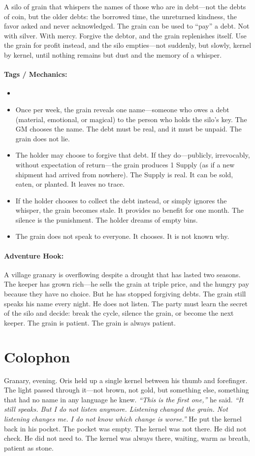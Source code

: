 A silo of grain that whispers the names of those who are in debt—not the debts of coin, but the older debts: the borrowed time, the unreturned kindness, the favor asked and never acknowledged. The grain can be used to ``pay''{} a debt. Not with silver. With mercy. Forgive the debtor, and the grain replenishes itself. Use the grain for profit instead, and the silo empties—not suddenly, but slowly, kernel by kernel, until nothing remains but dust and the memory of a whisper.

\paragraph{Tags / Mechanics:}
\begin{itemize}
\item [HEAL] [TRUTH] [SILENCE]
\item Once per week, the grain reveals one name—someone who owes a debt (material, emotional, or magical) to the person who holds the silo's key. The GM chooses the name. The debt must be real, and it must be unpaid. The grain does not lie.
\item The holder may choose to forgive that debt. If they do—publicly, irrevocably, without expectation of return—the grain produces 1 Supply (as if a new shipment had arrived from nowhere). The Supply is real. It can be sold, eaten, or planted. It leaves no trace.
\item If the holder chooses to collect the debt instead, or simply ignores the whisper, the grain becomes stale. It provides no benefit for one month. The silence is the punishment. The holder dreams of empty bins.
\item The grain does not speak to everyone. It chooses. It is not known why.
\end{itemize}

\paragraph{Adventure Hook:}
A village granary is overflowing despite a drought that has lasted two seasons. The keeper has grown rich—he sells the grain at triple price, and the hungry pay because they have no choice. But he has stopped forgiving debts. The grain still speaks his name every night. He does not listen. The party must learn the secret of the silo and decide: break the cycle, silence the grain, or become the next keeper. The grain is patient. The grain is always patient.

\section*{Colophon}
Granary, evening. Oris held up a single kernel between his thumb and forefinger. The light passed through it—not brown, not gold, but something else, something that had no name in any language he knew. \textit{``This is the first one,''} he said. \textit{``It still speaks. But I do not listen anymore. Listening changed the grain. Not listening changes me. I do not know which change is worse.''} He put the kernel back in his pocket. The pocket was empty. The kernel was not there. He did not check. He did not need to. The kernel was always there, waiting, warm as breath, patient as stone.